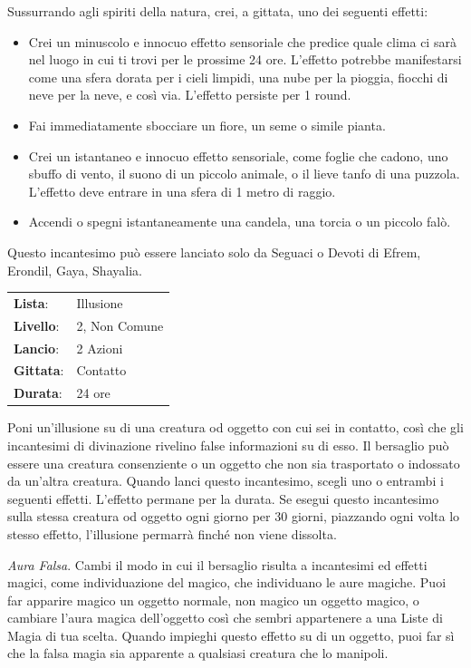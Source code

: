 \begin{multicols}{2}
Sussurrando agli spiriti della natura, crei, a gittata, uno dei seguenti effetti:

\begin{itemize}[leftmargin=*] \setlength{\itemsep}{0pt}
	\item Crei un minuscolo e innocuo effetto sensoriale che predice quale clima ci sarà nel luogo in cui ti trovi per le prossime 24 ore. L'effetto potrebbe manifestarsi come una sfera dorata per i cieli limpidi, una nube per la pioggia, fiocchi di neve per la neve, e così via. L'effetto persiste per 1 round.
	\item Fai immediatamente sbocciare un fiore, un seme o simile pianta.
	\item Crei un istantaneo e innocuo effetto sensoriale, come foglie che cadono, uno sbuffo di vento, il suono di un piccolo animale, o il lieve tanfo di una puzzola. L'effetto deve entrare in una sfera di 1 metro di raggio.
	\item Accendi o spegni istantaneamente una candela, una torcia o un piccolo falò.
\end{itemize}

Questo incantesimo può essere lanciato solo da Seguaci o Devoti di Efrem, Erondil, Gaya, Shayalia.

\noindent\begin{tabularx}{\linewidth}{p{1.3cm}X}
	\rowcolor{gray!20}\textbf{Lista}: & Illusione \\
	\textbf{Livello}: & 2, Non Comune \\
	\rowcolor{gray!20}\textbf{Lancio}: & 2 Azioni \\
	\textbf{Gittata}: & Contatto \\
	\rowcolor{gray!20}\textbf{Durata}: & 24 ore \\
\end{tabularx}\smallskip

Poni un'illusione su di una creatura od oggetto con cui sei in contatto, così che gli incantesimi di divinazione rivelino false informazioni su di esso. Il bersaglio può essere una creatura consenziente o un oggetto che non sia trasportato o indossato da un'altra creatura. Quando lanci questo incantesimo, scegli uno o entrambi i seguenti effetti. L'effetto permane per la durata. Se esegui questo incantesimo sulla stessa creatura od oggetto ogni giorno per 30 giorni, piazzando ogni volta lo stesso effetto, l'illusione permarrà finché non viene dissolta.

\emph{Aura Falsa}. Cambi il modo in cui il bersaglio risulta a incantesimi ed effetti magici, come individuazione del magico, che individuano le aure magiche. Puoi far apparire magico un oggetto normale, non magico un oggetto magico, o cambiare l'aura magica dell'oggetto così che sembri appartenere a una Liste di Magia di tua scelta. Quando impieghi questo effetto su di un oggetto, puoi far sì che la falsa magia sia apparente a qualsiasi creatura che lo manipoli.


\end{multicols}
